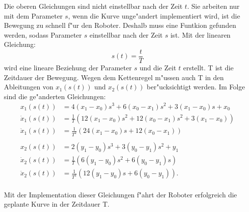 Die oberen Gleichungen sind nicht einstellbar nach der Zeit \(t\). Sie arbeiten nur mit dem Parameter \(s\), wenn die Kurve unge"andert implementiert wird, ist die Bewegung zu schnell f"ur den Roboter. Deshalb muss eine Funtkion gefunden werden, sodass Parameter \(s\) einstellbar nach der Zeit \(s\) ist. Mit der linearen Gleichung:
\begin{equation*}
    s(t) = \frac{t}{T}
\end{equation*}
wird eine lineare Beziehung der Parameter \(s\) und die Zeit \(t\) erstellt. T ist die Zeitdauer der Bewegung. Wegen dem Kettenregel m"ussen auch T in den Ableitungen von \(x_1(s(t))\) und \(x_2(s(t))\) ber"ucksichtigt werden. Im Folge sind die ge"anderten Gleichungen:
\begin{align*}
    x_1(s(t)) &= 4(x_1 - x_0)s^3 + 6(x_0 - x_1)s^2 + 3(x_1 - x_0)s + x_0 \\
    \dot{x}_1(s(t)) &= \frac{1}{T}(12(x_1 - x_0)s^2 + 12(x_0 - x_1)s^2 + 3(x_1 - x_0)) \\
    \ddot{x}_1(s(t)) &= \frac{1}{T^2}(24(x_1 - x_0)s + 12(x_0 - x_1)) \\
    \\
    x_2(s(t)) &= 2(y_1 - y_0)s^3 + 3(y_0 - y_1)s^2 + y_1 \\
    \dot{x}_2(s(t)) &= \frac{1}{T}(6(y_1 - y_0)s^2 + 6(y_0 - y_1)s) \\
    \ddot{x}_2(s(t)) &= \frac{1}{T^2}(12(y_1 - y_0)s + 6(y_0 - y_1)).
\end{align*} \\

Mit der Implementation dieser Gleichungen f"ahrt der Roboter erfolgreich die geplante Kurve in der Zeitdauer T.